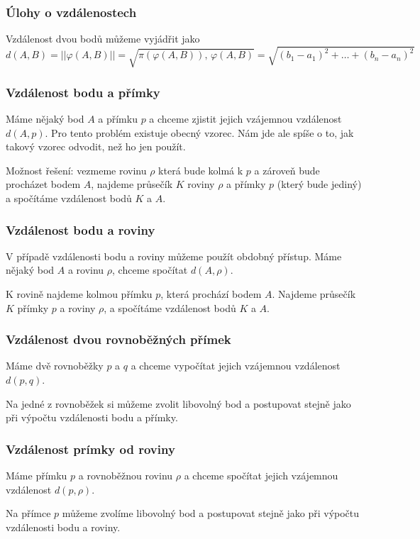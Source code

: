 \subsubsection{Úlohy o vzdálenostech}
Vzdálenost dvou bodů můžeme vyjádřit jako
$$d(A, B) = ||\varphi (A,B)|| = \sqrt{\pi(\varphi(A, B)),\, \varphi(A, B)} =
\sqrt{(b_1 - a_1)^2 + \ldots + (b_n - a_n)^2}$$

\subsubsection{Vzdálenost bodu a přímky}
Máme nějaký bod $A$ a přímku $p$ a chceme zjistit jejich vzájemnou
vzdálenost $d(A, p)$.
Pro tento problém existuje obecný vzorec. Nám jde ale spíše
o to, jak takový vzorec odvodit, než ho jen použít.

Možnost řešení: vezmeme rovinu $\rho$ která bude kolmá k $p$ a zároveň bude procházet
bodem $A$, najdeme průsečík $K$ roviny $\rho$ a přímky $p$ (který bude jediný) a spočítáme
vzdálenost bodů $K$ a $A$.

\subsubsection{Vzdálenost bodu a roviny}
V případě vzdálenosti bodu a roviny můžeme použít obdobný přístup.
Máme nějaký bod $A$ a rovinu $\rho$, chceme spočítat $d(A, \rho)$.

K rovině najdeme kolmou přímku $p$,
která prochází bodem $A$. Najdeme průsečík $K$ přímky $p$ a roviny $\rho$,
a spočítáme vzdálenost bodů $K$ a $A$.

\subsubsection{Vzdálenost dvou rovnoběžných přímek}
Máme dvě rovnoběžky $p$ a $q$ a chceme vypočítat jejich vzájemnou
vzdálenost $d(p, q)$.

Na jedné z rovnoběžek si můžeme zvolit libovolný bod a postupovat
stejně jako při výpočtu vzdálenosti bodu a přímky.

\subsubsection{Vzdálenost prímky od roviny}
Máme přímku $p$ a rovnoběžnou rovinu $\rho$ a chceme spočítat jejich vzájemnou
vzdálenost $d(p, \rho)$.

Na přímce $p$ můžeme zvolíme libovolný bod a postupovat stejně
jako při výpočtu vzdálenosti bodu a roviny.

